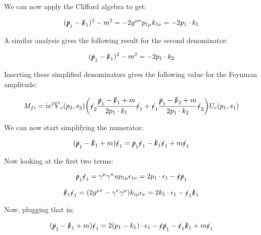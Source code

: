 \documentclass[a4]{article}
\begin{document}
    We can now apply the Clifford algebra to get:

    \begin{equation}
        (\slashed{p}_1 - \slashed{k}_1)^2 - m^2 = - 2 g^{\mu \nu} p_{1 \mu} k_{1 \nu} = - 2 p_1 \cdot k_1
    \end{equation}

    A similar analysis gives the following result for the second denominator:

    \begin{equation}
        (\slashed{p}_1 - \slashed{k}_1)^2 - m^2 = - 2 p_1 \cdot k_2
    \end{equation}

    Inserting these simplified denominators gives the following value for the Feynman amplitude:

    \begin{equation}
        M_{fi} = i e^2 \overline{V}_e (p_2, s_2) \bigg( \slashed{\epsilon}_2 \frac{\slashed{p}_1 - \slashed{k}_1 + m}{2 p_1 \cdot k_1} \slashed{\epsilon}_1  + \slashed{\epsilon}_1 \frac{\slashed{p}_1 - \slashed{k}_2 + m}{2 p_1 \cdot k_2} \slashed{\epsilon}_2 \bigg) U_e (p_1, s_1)
    \end{equation}

    We can now start simplifying the numerator:

    \begin{equation}
        (\slashed{p}_1 - \slashed{k}_1 + m) \slashed{\epsilon}_1 = \slashed{p}_1 \slashed{\epsilon}_1 - \slashed{k}_1 \slashed{\epsilon}_1 + m \slashed{\epsilon}_1
    \end{equation}

    Now looking at the first two terms:

    \begin{equation}
        \slashed{p}_1 \slashed{\epsilon}_1 = \gamma^\mu \gamma^nu p_{1 \mu} \epsilon_{1 \nu} = 2 p_1 \cdot \epsilon_1 - \slashed{\epsilon} \slashed{p}_1
    \end{equation}

    \begin{equation}
        \slashed{k}_1 \slashed{\epsilon}_1 = (2 g^{\mu \nu} - \gamma^\nu \gamma^\mu) k_{i \mu} \epsilon_\nu = 2 k_1 \cdot \epsilon_1 - \slashed{\epsilon}_1 \slashed{k}_1
    \end{equation}

    Now, plugging that in:

    \begin{equation}
        (\slashed{p}_1 - \slashed{k}_1 + m) \slashed{\epsilon}_1 = 2 (p_1 - k_1) \cdot \epsilon_1 - \slashed{\epsilon} \slashed{p}_1 - \slashed{\epsilon}_1 \slashed{k}_1 + m \slashed{\epsilon}_1
    \end{equation}
\end{document}
